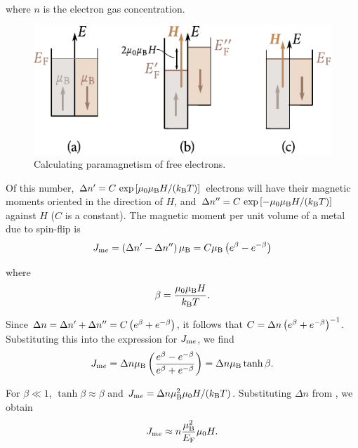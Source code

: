 \noindent
where $n$ is the electron gas concentration.

\begin{figure}[t]
	\begin{center}
		\includegraphics[scale=1]{figures/ch_07/fig_7_13.pdf}
		\caption[]{Calculating paramagnetism of free electrons.}
		\label{fig:7_13}
	\end{center}
	\vspace{-0.8cm}
\end{figure}

Of this number, $\Delta{n}'=C\,\exp\left[\mu_0\mu_{\text{B}}H/(k_{\text{B}}T)\right]$ electrons will have their magnetic moments oriented in the direction of $H$, and $\Delta{n}''=C\,\exp\left[-\mu_0\mu_{\text{B}}H/(k_{\text{B}}T)\right]$ against $H$ ($C$ is a constant). The magnetic moment per unit volume of a metal due to spin-flip is
\begin{equation*}
    J_{\text{m$e$}} = \left(\Delta{n}'-\Delta{n}''\right) \mu_{\text{B}} = C \mu_{\text{B}} \left(e^{\beta} - e^{-\beta}\right)
\end{equation*}

\noindent
where
\begin{equation*}
    \beta = \frac{\mu_0\mu_{\text{B}}H}{k_{\text{B}}T}.
\end{equation*}

Since $\Delta{n} =\Delta{n}'+\Delta{n}''=C\left(e^{\beta}+e^{-\beta}\right)$, it follows that $C=\Delta{n}\left(e^{\beta}+e^{-\beta}\right)^{-1}$. Substituting this into the expression for $J_{\text{m$e$}}$, we find
\begin{equation*}
    J_{\text{m$e$}} = \Delta{n} \mu_{\text{B}} \left(\frac{e^{\beta}-e^{-\beta}}{e^{\beta}+e^{-\beta}}\right) = \Delta{n} \mu_{\text{B}} \tanh\beta.
\end{equation*}

\noindent
For $\beta\ll 1$, $\tanh\beta\approx\beta$ and $J_{\text{m$e$}}=\Delta{n}\mu_{\text{B}}^2\mu_0 H/(k_{\text{B}}T)$. Substituting $\Delta{n}$ from , we obtain
\begin{equation}\label{eq:7_62}
    J_{\text{m$e$}} \approx n \frac{\mu_{\text{B}}^2}{E_{\text{F}}} \mu_0 H.
\end{equation}

